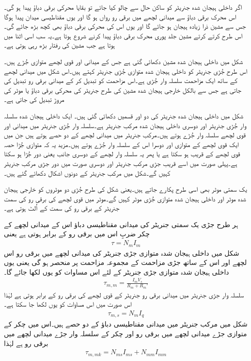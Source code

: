  اگر داخلی ہیجان شدہ جنریٹر کو ساکن حال سے چالو کیا جائے تو بقایا محرکی برقی دباؤ پیدا ہو گی۔اس محرک برقی دباؤ سے میدانی لچھے میں برقی رو رواں ہو گا اور یوں مقناطیسی میدان پیدا ہوگا جس سے مشین ذرا زیادہ ہیجان ہو جائے گا اور یوں اس کی محرکی برقی دباؤ بھی کچھ بڑھ جائے گی۔اس طرح کرتے کرتے مشین جلد پوری محرک برقی دباؤ پیدا کرنے شروع ہوتا ہے۔یہ سب اسی اثنا میں ہوتا ہے جب مشین کی رفتار بڑھ رہی ہوتی ہے۔

شکل میں داخلی ہیجان شدہ مشین دکھائی گئی ہے جس کے میدانی اور قوی لچھے متوازی جُڑے ہیں۔ اس طرح جُڑی جنریٹر کو داخلی ہیجان شدہ  متوازی جُڑی جنریٹر کہتے ہیں۔اس شکل میں میدانی لچھے کے ساتھ ایک مزاحمت سلسلہ وار جُڑی ہے۔اس مزاحمت کو تبدیل کر کے میدانی برقی رو تبدیل کی جاتی ہے جس سے بالکل خارجی ہیجان شدہ مشین کی طرح جنریٹر کی محرکی برقی دباؤ یا موٹر کی مروڑ تبدیل کی جاتی ہے۔

شکل  میں داخلی ہیجان شدہ جنریٹر کی دو اور قسمیں دکھائی گئی ہیں۔ ایک داخلی ہیجان شدہ  سلسلہ وار جُڑی جنریٹر  اور دوسری داخلی ہیجان شدہ  مرکب جنریٹر  ہے۔سلسلہ وار جُڑی جنریٹر میں میدانی اور قوی لچھے سلسلہ وار جُڑے ہوتے ہیں۔مرکب جنریٹر میں میدانی لچھے کے دو حصے ہوتے ہیں جن میں ایک قوی لچھے کے متوازی اور دوسرا اس کے سلسلہ وار جُڑے ہوتے ہیں۔مزید یہ کہ متوازی جُڑا حصہ قوی لچھے کے قریب ہو سکتا ہے یا پھر یہ سلسلہ وار لچھے کے دوسری جانب یعنی دور جُڑا ہو سکتا ہے۔پہلی صورت میں اسے قریب جڑی مرکب جنریٹر اور دوسری صورت میں دور جڑی مرکب جنریٹر کہیں گے۔شکل  میں مرکب جنریٹر کے دونوں اشکال دکھائے گئے ہیں۔ 

یک سمتی موٹر بھی اسی طرح پکارے جاتے ہیں۔یعنی شکل  کی طرح جُڑی دو موٹروں کو خارجی ہیجان شدہ موٹر اور داخلی ہیجان شدہ متوازی جُڑی موٹر کہیں گے۔موٹر میں قوی لچھے کی برقی رو کی سمت جنریٹر کے برقی رو کی سمت کے اُلٹ ہوتی ہے۔

ہر طرح جڑی یک سمتی جنریٹر کی میدانی مقناطیسی دباؤ اس کے میدانی لچھے کے چکر ضربِ اس میں برقی رو کے برابر ہوتی ہے یعنی
\begin{align}
\tau=N_m I_m
\end{align}
شکل  میں داخلی ہیجان شدہ متوازی جڑی جنریٹر کی میدانی لچھے میں برقی رو اس لچھے اور اس کے ساتھ جڑی مزاحمت کے مجموعہ  مزاحمت  پر منحصر ہو گی یعنی  یوں داخلی ہیجان شدہ متوازی جڑی جنریٹر کے لئے اس مساوات کو یوں لکھا جائے گا۔
\begin{align}
\tau_{m,m}=\frac{I_m V_s}{R_m+R_m'}
\end{align}
سلسلہ وار جڑی جنریٹر میں میدانی برقی رو جنریٹر کے قوی لچھے کی برقی رو کے برابر ہوتی ہے لہٰذا اس صورت میں اس مساوات کو یوں لکھا جا سکتا ہے۔
\begin{align}
\tau_{m,s}=N_m I_q
\end{align}
شکل  میں مرکب جنریٹر میں میدانی مقناطیسی دباؤ کے دو حصے ہیں۔اس میں  چکر کے متوازی جڑے میدانی لچھے میں برقی رو   اور   چکر کے سلسلہ وار جڑے میدانی لچھے میں  برقی رو  ہے لہٰذا
\begin{align}
\tau_{m,mk}=N_{ms} I_{ms}+N_{mm} I_{mm}
\end{align}

